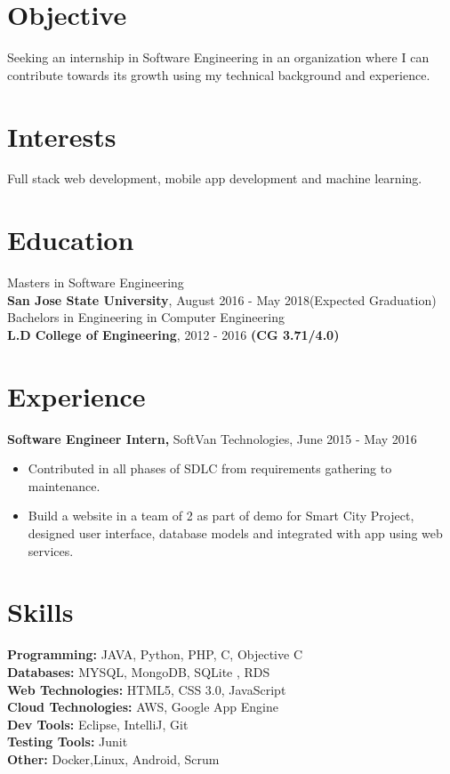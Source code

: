 \documentclass[margin]{res}
\begin{document}
\begin{resume}
\section{Objective}
Seeking an internship in Software Engineering in an organization where I can contribute towards its growth using my technical background and experience. 
\section{Interests}
Full stack web development, mobile app development and machine learning.
\section{Education}
  Masters in Software Engineering \\
  \vspace{1.5mm}
  {\bf San Jose State University}, August 2016 - May 2018(Expected Graduation) \\ 
   Bachelors in Engineering in Computer Engineering \\
   \vspace{1.5mm}
  {\bf  L.D College of Engineering}, 2012 - 2016 {\bf (CG 3.71/4.0) } 

\section{Experience}
 {\bf Software Engineer Intern,} SoftVan Technologies, \hfill June  2015  - May 2016
 \begin{itemize} \itemsep -1pt  %
 \item Contributed in all phases of SDLC from requirements gathering to maintenance.
  \item Build a website in a team of 2 as part of demo for Smart City Project, designed user interface, database models and integrated with app using web services.
\end{itemize}
  
\section{Skills}
{\bf Programming:}  JAVA, Python, PHP, C, Objective C \\
   {\bf Databases:}  MYSQL, MongoDB, SQLite , RDS \\
  {\bf Web Technologies:}   HTML5, CSS 3.0, JavaScript \\
  {\bf Cloud Technologies:}   AWS, Google App Engine \\
    {\bf Dev Tools:}  Eclipse, IntelliJ, Git \\
    {\bf Testing Tools:}  Junit \\
    {\bf Other:}  Docker,Linux, Android, Scrum  
    

\end{resume}
\end{document}
